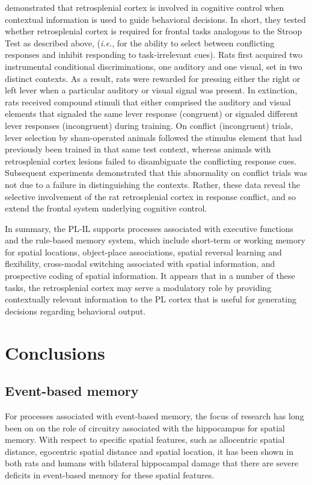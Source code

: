 \documentclass[doc, longtable]{apa6}
\begin{document}
\textcite{Nelson2014a} demonstrated that retrosplenial cortex is involved in cognitive control when contextual information is used to guide behavioral decisions. In short, they tested whether retrosplenial cortex is required for frontal tasks analogous to the Stroop Test as described above, (\textit{i.e.}, for the ability to select between conflicting responses and inhibit responding to task-irrelevant cues). Rats first acquired two instrumental conditional discriminations, one auditory and one visual, set in two distinct contexts. As a result, rats were rewarded for pressing either the right or left lever when a particular auditory or visual signal was present. In extinction, rats received compound stimuli that either comprised the auditory and visual elements that signaled the same lever response (congruent) or signaled different lever responses (incongruent) during training. On conflict (incongruent) trials, lever selection by sham-operated animals followed the stimulus element that had previously been trained in that same test context, whereas animals with retrosplenial cortex lesions failed to disambiguate the conflicting response cues. Subsequent experiments demonstrated that this abnormality on conflict trials was not due to a failure in distinguishing the contexts. Rather, these data reveal the selective involvement of the rat retrosplenial cortex in response conflict, and so extend the frontal system underlying cognitive control.
	
In summary, the PL-IL supports processes associated with executive functions and the rule-based memory system, which include short-term or working memory for spatial locations, object-place associations, spatial reversal learning and flexibility, cross-modal switching associated with spatial information, and prospective coding of spatial information. It appears that in a number of these tasks, the retrosplenial cortex may serve a modulatory role by providing contextually relevant information to the PL cortex that is useful for generating decisions regarding behavioral output.

\section{Conclusions}

\subsection{Event-based memory}
For processes associated with event-based memory, the focus of research has long been on on the role of circuitry associated with the hippocampus for spatial memory. With respect to specific spatial features, such as allocentric spatial distance, egocentric spatial distance and spatial location, it has been shown in both rats and humans with bilateral hippocampal damage that there are severe deficits in event-based memory for these spatial features.
	
\end{document}
